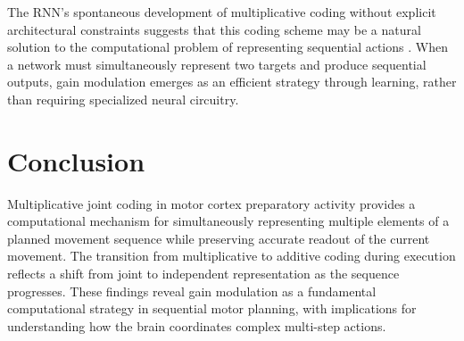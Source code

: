 \documentclass[12pt]{article}
\begin{document}
The RNN's spontaneous development of multiplicative coding without explicit architectural constraints suggests that this coding scheme may be a natural solution to the computational problem of representing sequential actions \citep{sussillo2015neural, mante2013context}. When a network must simultaneously represent two targets and produce sequential outputs, gain modulation emerges as an efficient strategy through learning, rather than requiring specialized neural circuitry.

\section{Conclusion}

Multiplicative joint coding in motor cortex preparatory activity provides a computational mechanism for simultaneously representing multiple elements of a planned movement sequence while preserving accurate readout of the current movement. The transition from multiplicative to additive coding during execution reflects a shift from joint to independent representation as the sequence progresses. These findings reveal gain modulation as a fundamental computational strategy in sequential motor planning, with implications for understanding how the brain coordinates complex multi-step actions.



\end{document}

